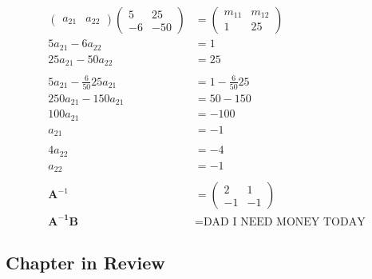 \documentclass{article}
\begin{document}
\begin{align*}
\begin{pmatrix}
    a_{21} & a_{22}
  \end{pmatrix} \begin{pmatrix}
                  5  & 25  \\
                  -6 & -50
                \end{pmatrix}        & = \begin{pmatrix}
                                           m_{11} & m_{12} \\
                                           1      & 25
                                         \end{pmatrix}                 \\
  5 a_{21} - 6 a_{22}                  & = 1                             \\
  25 a_{21} - 50 a_{22}                & = 25                            \\ \\
  5 a_{21} - \frac{6}{50} 25 a_{21}    & = 1 - \frac{6}{50} 25           \\
  250 a_{21} - 150 a_{21}              & = 50 - 150                      \\
  100 a_{21}                           & = -100                          \\
  a_{21}                               & = -1                            \\ \\
  4 a_{22}                             & = -4                            \\
  a_{22}                               & = -1                            \\ \\
  \mathbf{A}^{-1}                      & = \begin{pmatrix}
                                             2  & 1  \\
                                             -1 & -1
                                           \end{pmatrix}                \\
  \mathbf{A^{-1} B}                    & = \text{DAD I NEED MONEY TODAY}
\end{align*}

\subsection{Chapter in Review}

\subsubsection{}
\end{document}
